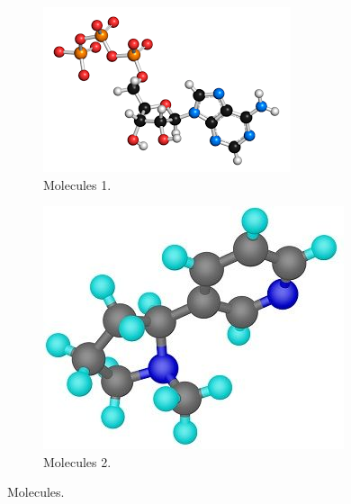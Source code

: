 \begin{figure}[!hbt]
    \centering
    \begin{subfigure}[b]{0.495\textwidth}
        \centering
        \includegraphics[width=\textwidth]{Figures/Theory/molecules.png}
        \caption{Molecules 1.}
        \label{fig:molecules1}
    \end{subfigure}
    \hfill
    \begin{subfigure}[b]{0.485\textwidth}
        \centering
        \includegraphics[width=\textwidth]{Figures/Theory/molecules1.jpg}
        \caption{Molecules 2.}
        \label{fig:molecules2}
    \end{subfigure}
    \caption{Molecules.}
    \label{fig:molecules}
\end{figure}

